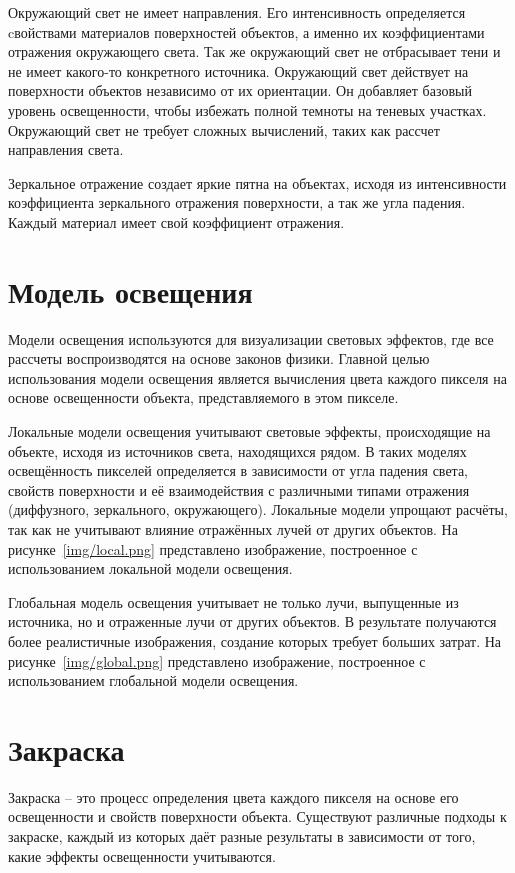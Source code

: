 Окружающий свет не имеет направления. Его интенсивность определяется cвойствами материалов поверхностей объектов, а именно их коэффициентами отражения окружающего света.
Так же окружающий свет не отбрасывает тени и не имеет какого-то конкретного источника.
Окружающий свет действует на поверхности объектов независимо от их ориентации. Он добавляет базовый уровень освещенности, чтобы избежать полной темноты на теневых участках. Окружающий свет не требует сложных вычислений, таких как рассчет направления света.
 
Зеркальное отражение создает яркие пятна на объектах, исходя из интенсивности коэффициента зеркального отражения поверхности, а так же угла падения.
Каждый материал имеет свой коэффициент отражения.

\section{Модель освещения}
Модели освещения используются для визуализации световых эффектов, где все рассчеты воспроизводятся на основе законов физики. Главной целью использования модели освещения является вычисления цвета каждого пикселя на основе освещенности объекта, представляемого в этом пикселе.

Локальные модели освещения учитывают световые эффекты, происходящие на объекте, исходя из источников света, находящихся рядом. В таких моделях освещённость пикселей определяется в зависимости от угла падения света, свойств поверхности и её взаимодействия с различными типами отражения (диффузного, зеркального, окружающего). Локальные модели упрощают расчёты, так как не учитывают влияние отражённых лучей от других объектов. На рисунке~\ref{img/local.png} представлено изображение, построенное с использованием локальной модели освещения.


Глобальная модель освещения учитывает не только лучи, выпущенные из источника, но и отраженные лучи от других объектов. В результате получаются более реалистичные изображения, создание которых требует больших затрат. На рисунке~\ref{img/global.png} представлено изображение, построенное с использованием глобальной модели освещения.


\section{Закраска} Закраска -- это процесс определения цвета каждого пикселя на основе его освещенности и свойств поверхности объекта. Существуют различные подходы к закраске, каждый из которых даёт разные результаты в зависимости от того, какие эффекты освещенности учитываются.

